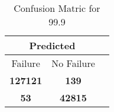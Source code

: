\begin{table}[] 
\caption{Confusion Matric for 99.9} 
\label{Table: Prediction Accuracy-DMD99.9OnlySunEKF-resetReflection-Reflection} 
\centering 
\begin{tabular} 
 {@{}ccc@{}} 
\toprule 
\multicolumn{2}{c}{\textbf{Predicted}}
 \\ \midrule 
\multicolumn{1}{|c|}{Failure} & 
\multicolumn{1}{c|}{No Failure}
 \\ \midrule 
\multicolumn{1}{|c|}{\color{green}\textbf{127121}} & 
\multicolumn{1}{c|}{\color{red}\textbf{139}}
 \\ \midrule 
\multicolumn{1}{|c|}{\color{red}\textbf{53}} & 
\multicolumn{1}{c|}{\color{green}\textbf{42815}}
 \\ \bottomrule 
\end{tabular} 
\end{table} 
